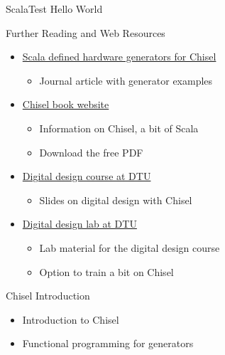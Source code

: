 \begin{frame}[fragile]{ScalaTest Hello World}
\end{frame}


\begin{frame}[fragile]{Further Reading and Web Resources}
\begin{itemize}
\item \href{https://www.sciencedirect.com/science/article/pii/S014193312500050X}{Scala defined hardware generators for Chisel}
\begin{itemize}
\item Journal article with generator examples
\end{itemize}
\item \href{http://www.imm.dtu.dk/~masca/chisel-book.html}{Chisel book website}
\begin{itemize}
\item Information on Chisel, a bit of Scala
\item Download the free PDF
\end{itemize}
\item \href{http://www2.imm.dtu.dk/courses/02139/}{Digital design course at DTU}
\begin{itemize}
\item Slides on digital design with Chisel
\end{itemize}
\item \href{https://github.com/schoeberl/chisel-lab}{Digital design lab at DTU}
\begin{itemize}
\item Lab material for the digital design course
\item Option to train a bit on Chisel
\end{itemize}
\end{itemize}
\end{frame}






\begin{frame}[fragile]{Chisel Introduction}
\begin{itemize}
\item Introduction to Chisel
\item Functional programming for generators
\end{itemize}
\end{frame}

